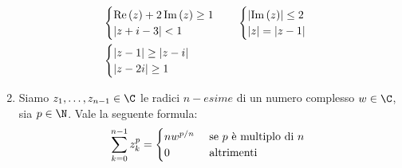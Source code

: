 \begin{enumerate}
\begin{align*}
		       & \begin{cases}
			         \operatorname{Re}  \left(z\right) + 2 \operatorname{Im} \left(z\right) \ge 1 \\
			         \left|z + i -3\right| <1
		         \end{cases} &  & \begin{cases}
			                          \left|\operatorname{Im} \left(z\right)\right| \le 2 \\
			                          \left|z\right| = \left|z-1\right|
		                          \end{cases} \\
		       &
		      \begin{cases}
			      \left|z-1\right| \ge  \left|z-i\right| \\
			      \left| z - 2i \right| \ge  1
		      \end{cases}
	      \end{align*}
	\item Siamo $ z_1 ,\ldots , z_{n-1} \in  \C  $ le radici $ n-esime $ di un numero complesso $ w \in  \C  $, sia $ p \in  \N  $. Vale la seguente formula:
	      \[
		      \sum_{k=0}^{n-1} z_k^{p} = \begin{cases}
			      nw ^{ p/n } & \text{ se $ p $ è multiplo di $ n $ } \\
			      0           & \text{ altrimenti }
		      \end{cases}
	      \]
\end{enumerate}
